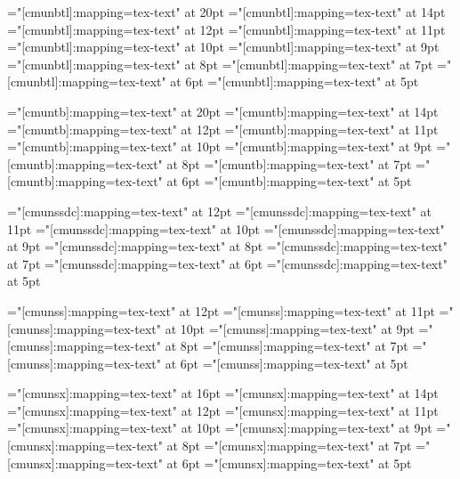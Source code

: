 \font\twentytt="[cmunbtl]:mapping=tex-text"     at 20pt
\font\fourteentt="[cmunbtl]:mapping=tex-text"   at 14pt
\font\twelvett="[cmunbtl]:mapping=tex-text"     at 12pt
\font\eleventt="[cmunbtl]:mapping=tex-text"     at 11pt
\font\tentt="[cmunbtl]:mapping=tex-text"        at 10pt
\font\ninett="[cmunbtl]:mapping=tex-text"       at 9pt
\font\eighttt="[cmunbtl]:mapping=tex-text"      at 8pt
\font\seventt="[cmunbtl]:mapping=tex-text"      at 7pt
\font\sixtt="[cmunbtl]:mapping=tex-text"        at 6pt
\font\fivett="[cmunbtl]:mapping=tex-text"       at 5pt

\font\twentyttbf="[cmuntb]:mapping=tex-text"     at 20pt
\font\fourteenttbf="[cmuntb]:mapping=tex-text"   at 14pt
\font\twelvettbf="[cmuntb]:mapping=tex-text"     at 12pt
\font\eleventtbf="[cmuntb]:mapping=tex-text"     at 11pt
\font\tenttbf="[cmuntb]:mapping=tex-text"        at 10pt
\font\ninettbf="[cmuntb]:mapping=tex-text"       at 9pt
\font\eighttbft="[cmuntb]:mapping=tex-text"      at 8pt
\font\seventtbf="[cmuntb]:mapping=tex-text"      at 7pt
\font\sixttbf="[cmuntb]:mapping=tex-text"        at 6pt
\font\fivettbf="[cmuntb]:mapping=tex-text"       at 5pt

\font\twelvessdc="[cmunssdc]:mapping=tex-text"  at 12pt
\font\elevenssdc="[cmunssdc]:mapping=tex-text"  at 11pt
\font\tenssdc="[cmunssdc]:mapping=tex-text"     at 10pt
\font\ninessdc="[cmunssdc]:mapping=tex-text"    at 9pt
\font\eightssdc="[cmunssdc]:mapping=tex-text"   at 8pt
\font\sevenssdc="[cmunssdc]:mapping=tex-text"   at 7pt
\font\sixssdc="[cmunssdc]:mapping=tex-text"     at 6pt
\font\fivessdc="[cmunssdc]:mapping=tex-text"    at 5pt

\font\twelvess="[cmunss]:mapping=tex-text"      at 12pt
\font\elevenss="[cmunss]:mapping=tex-text"      at 11pt
\font\tenss="[cmunss]:mapping=tex-text"         at 10pt
\font\niness="[cmunss]:mapping=tex-text"        at 9pt
\font\eightss="[cmunss]:mapping=tex-text"       at 8pt
\font\sevenss="[cmunss]:mapping=tex-text"       at 7pt
\font\sixss="[cmunss]:mapping=tex-text"         at 6pt
\font\fivess="[cmunss]:mapping=tex-text"        at 5pt

\font\sixteenssbf="[cmunsx]:mapping=tex-text"  at 16pt
\font\fourteenssbf="[cmunsx]:mapping=tex-text" at 14pt
\font\twelvessbf="[cmunsx]:mapping=tex-text"   at 12pt
\font\elevenssbf="[cmunsx]:mapping=tex-text"   at 11pt
\font\tenssbf="[cmunsx]:mapping=tex-text"      at 10pt
\font\ninessbf="[cmunsx]:mapping=tex-text"     at 9pt
\font\eightssbf="[cmunsx]:mapping=tex-text"    at 8pt
\font\sevenssbf="[cmunsx]:mapping=tex-text"    at 7pt
\font\sixssbf="[cmunsx]:mapping=tex-text"      at 6pt
\font\fivessbf="[cmunsx]:mapping=tex-text"     at 5pt

